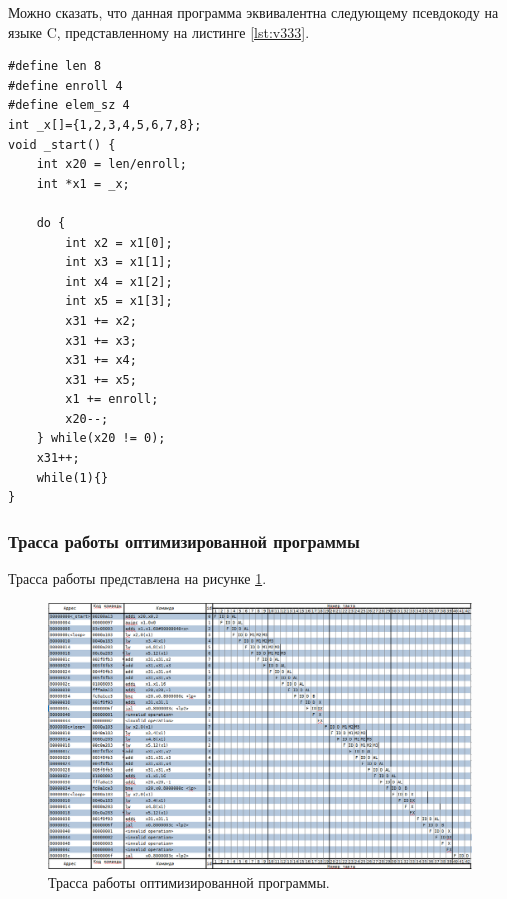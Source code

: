 Можно сказать, что данная программа эквивалентна следующему псевдокоду на языке C, представленному на листинге \ref{lst:v333}.

\begin{lstlisting}[label=lst:v333,caption=Псевдокод программы (оптимизированный)]
#define len 8
#define enroll 4
#define elem_sz 4
int _x[]={1,2,3,4,5,6,7,8};
void _start() {
	int x20 = len/enroll;
	int *x1 = _x;
	
	do {
		int x2 = x1[0];
		int x3 = x1[1];
		int x4 = x1[2];
		int x5 = x1[3];
		x31 += x2;
		x31 += x3;
		x31 += x4;
		x31 += x5;
		x1 += enroll;
		x20--;
	} while(x20 != 0);
	x31++;
	while(1){}
}
\end{lstlisting}

\clearpage

\subsubsection*{Трасса работы оптимизированной программы}
Трасса работы представлена на рисунке \ref{img:t5-trasa-02}.

\begin{figure}[h]
	\centering
	\includegraphics[height=0.4\textheight]{img/t5-trasa-02}
	\caption{Трасса работы оптимизированной программы.}
	\label{img:t5-trasa-02}
\end{figure}

